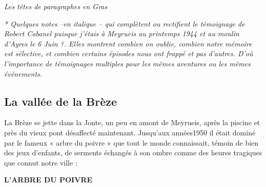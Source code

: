 \vspace{0.3cm}

\textit{Les têtes de paragraphes en Gras}

\vspace{0.3cm}

\textit{* Quelques notes --en italique -- qui complètent ou rectifient le témoignage de Robert Cabanel puisque
j’étais à Meyrueis au printemps 1944 et au moulin d’Ayres le 6 Juin ?. Elles montrent combien on
oublie, combien notre mémoire est sélective, et combien certains épisodes nous ont frappé et pas
d’autres. D’où l’importance de témoignages multiples pour les mêmes aventures ou les mêmes
événements.}



\subsection{La  vallée de la Brèze}

La Brèze se jette dans la Jonte, un peu en amont de Meyrueis, après la piscine et près du
vieux pont désaffecté maintenant. Jusqu’aux années1950 il était dominé par le fameux « arbre
du poivre » que tout le monde connaissait, témoin de bien des jeux d’enfants, de serments
échangés à son ombre comme des heures tragiques que connut notre ville :

\vspace{0.65cm}

\begin{center}
    {\large\bfseries L’ARBRE DU POIVRE}
\end{center}

\vspace{0.45cm}

